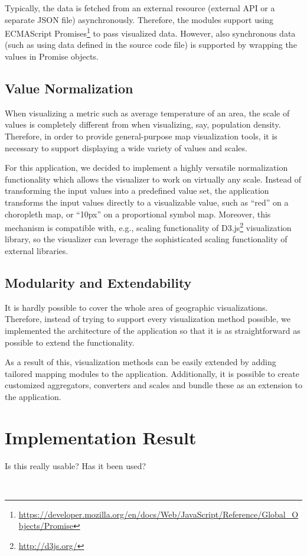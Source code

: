 Typically, the data is fetched from an external resource (external API or a separate JSON file) asynchronously. Therefore, the modules support using ECMAScript Promises\footnote{\url{https://developer.mozilla.org/en/docs/Web/JavaScript/Reference/Global_Objects/Promise}} to pass visualized data. However, also synchronous data (such as using data defined in the source code file) is supported by wrapping the values in Promise objects.

\subsection{Value Normalization}

When visualizing a metric such as average temperature of an area, the scale of values is completely different from when visualizing, say, population density. Therefore, in order to provide general-purpose map visualization tools, it is necessary to support displaying a wide variety of values and scales.

For this application, we decided to implement a highly versatile normalization functionality which allows the visualizer to work on virtually any scale. Instead of transforming the input values into a predefined value set, the application transforms the input values directly to a visualizable value, such as ``red'' on a choropleth map, or ``10px'' on a proportional symbol map. Moreover, this mechanism is compatible with, e.g., scaling functionality of D3.js\footnote{\url{http://d3js.org/}} visualization library, so the visualizer can leverage the sophisticated scaling functionality of external libraries.

\subsection{Modularity and Extendability}

It is hardly possible to cover the whole area of geographic visualizations. Therefore, instead of trying to support every visualization method possible, we implemented the architecture of the application so that it is as straightforward as possible to extend the functionality.

As a result of this, visualization methods can be easily extended by adding tailored mapping modules to the application. Additionally, it is possible to create customized aggregators, converters and scales and bundle these as an extension to the application.

\section{Implementation Result}

Is this really usable? Has it been used? 

~

